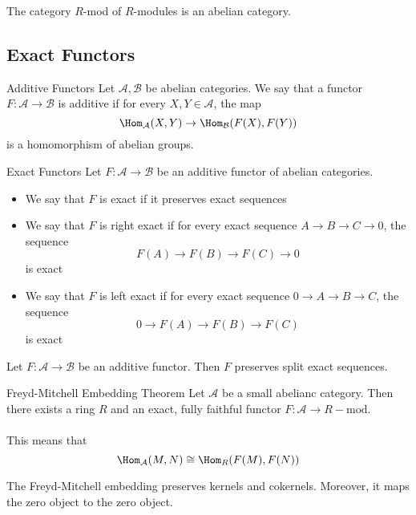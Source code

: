 \documentclass[a4paper]{article}
\begin{document}
\begin{thm}{}{} The category $R$-mod of $R$-modules is an abelian category. 
\end{thm}

\subsection{Exact Functors}
\begin{defn}{Additive Functors}{} Let $\mathcal{A},\mathcal{B}$ be abelian categories. We say that a functor $F:\mathcal{A}\to\mathcal{B}$ is additive if for every $X,Y\in\mathcal{A}$, the map $$\Hom_\mathcal{A}(X,Y)\to\Hom_\mathcal{B}(F(X),F(Y))$$ is a homomorphism of abelian groups. 
\end{defn}

\begin{defn}{Exact Functors}{} Let $F:\mathcal{A}\to\mathcal{B}$ be an additive functor of abelian categories. 
\begin{itemize}
\item We say that $F$ is exact if it preserves exact sequences
\item We say that $F$ is right exact if for every exact sequence $A\to B\to C\to 0$, the sequence $$F(A)\to F(B)\to F(C)\to 0$$ is exact
\item We say that $F$ is left exact if for every exact sequence $0\to A\to B\to C$, the sequence $$0\to F(A)\to F(B)\to F(C)$$ is exact
\end{itemize}
\end{defn}

\begin{prp}{}{} Let $F:\mathcal{A}\to\mathcal{B}$ be an additive functor. Then $F$ preserves split exact sequences. 
\end{prp}

\begin{thm}{Freyd-Mitchell Embedding Theorem}{} Let $\mathcal{A}$ be a small abelianc category. Then there exists a ring $R$ and an exact, fully faithful functor $F:\mathcal{A}\to R-\text{mod}$. \\~\\
This means that $$\Hom_{\mathcal{A}}(M,N)\cong\Hom_R(F(M),F(N))$$
\end{thm}

\begin{lmm}{}{} The Freyd-Mitchell embedding preserves kernels and cokernels. Moreover, it maps the zero object to the zero object. 
\end{lmm}
\end{document}

